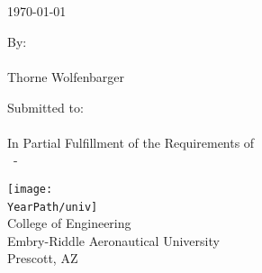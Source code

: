 \begin{titlepage}
  \begin{center}
      \vspace*{1cm}

      \Large
      \textbf{\AssignmentTitle}

      \vspace{0.5cm}
      \large
      \AssignmentSub \\
      ~\\
      \normalsize \today

      \vspace{1.5cm}

      \large
      By: \\
      ~\\
      \normalsize
      \vspace{1ex}
      \ifdefined\StudentNames \StudentNames \else Thorne Wolfenbarger\fi
      \vfill

      \vspace{0.8cm}

      \large
      Submitted to: \\
      \Professor \\
      In Partial Fulfillment of the Requirements of \\
      \Course~-~\Semester\\

      \vspace{0.8cm}

      \texttt{[image: \\YearPath/univ]}
      ~\\
      College of Engineering\\
      Embry-Riddle Aeronautical University\\
      Prescott, AZ\\

  \end{center}
\end{titlepage}

